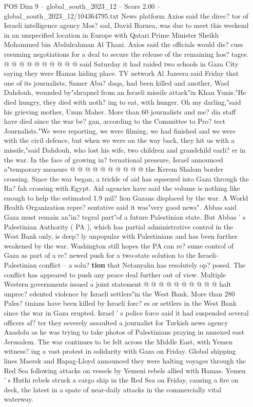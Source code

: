 \begin{textsample}{POS Dim 9 – global\_south\_2023\_12 – Score 2.00 – global\_south\_2023\_12/104364795.txt}
News platform Axios said the direc? tor of Israeli intelligence agency Mos? sad, David Barnea, was due to meet this weekend in an unspecified location in Europe with Qatari Prime Minister Sheikh Mohammed bin Abdulrahman Al Thani.
Axios said the officials would dis? cuss resuming negotiations for a deal to secure the release of the remaining hos? tages. @ @ @ @ @ @ @ @ @ @ said Saturday it had raided two schools in Gaza City saying they were Hamas hiding place.
TV network Al Jazeera said Friday that one of its journalists, Samer Abu? daqa, had been killed and another, Wael Dahdouh, wounded by"shrapnel from an Israeli missile attack"in Khan Yunis."He died hungry, they died with noth? ing to eat, with hunger.
Oh my darling,"said his grieving mother, Umm Maher.
More than 60 journalists and me? dia staff have died since the war be? gan, according to the Committee to Pro? tect Journalists."We were reporting, we were filming, we had finished and we were with the civil defence, but when we were on the way back, they hit us with a missile,"said Dahdouh, who lost his wife, two children and grandchild earli? er in the war.
In the face of growing in? ternational pressure, Israel announced a"temporary measure @ @ @ @ @ @ @ @ @ @ the Kerem Shalom border crossing.
Since the war began, a trickle of aid has squeezed into Gaza through the Ra? fah crossing with Egypt.
Aid agencies have said the volume is nothing like enough to help the estimated 1.9 mil? lion Gazans displaced by the war.
A World Health Organization repre? sentative said it was"very good news".
Abbas said Gaza must remain an"in? tegral part"of a future Palestinian state.
But Abbas ' s Palestinian Authority ( PA ), which has partial administrative control in the West Bank only, is deep? ly unpopular with Palestinians and has been further weakened by the war.
Washington still hopes the PA can re? sume control of Gaza as part of a re? newed push for a two-state solution to the Israeli-Palestinian conflict -- a solu? \textbf{tion} that Netanyahu has resolutely op? posed.
The conflict has appeared to push any peace deal further out of view.
Multiple Western governments issued a joint statement @ @ @ @ @ @ @ @ @ @ halt unprec? edented violence by Israeli settlers"in the West Bank.
More than 280 Pales? tinians have been killed by Israeli forc? es or settlers in the West Bank since the war in Gaza erupted.
Israel ' s police force said it had suspended several officers af? ter they severely assaulted a journalist for Turkish news agency Anadolu as he was trying to take photos of Palestinians praying in annexed east Jerusalem.
The war continues to be felt across the Middle East, with Yemen witness? ing a vast protest in solidarity with Gaza on Friday.
Global shipping lines Maersk and Hapag-Lloyd announced they were halting voyages through the Red Sea following attacks on vessels by Yemeni rebels allied with Hamas.
Yemen ' s Huthi rebels struck a cargo ship in the Red Sea on Friday, causing a fire on deck, the latest in a spate of near-daily attacks in the commercially vital waterway.

\end{textsample}
